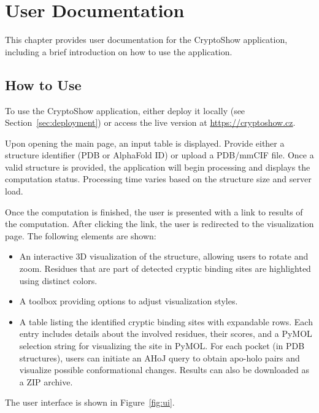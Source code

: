 \chapter{User Documentation}
\label{chap:user-documentation}

This chapter provides user documentation for the CryptoShow application, including a brief introduction on how to use the application.

\section{How to Use}
\label{sec:how-to-use}

To use the CryptoShow application, either deploy it locally (see Section~\ref{sec:deployment}) or access the live version at \url{https://cryptoshow.cz}.

Upon opening the main page, an input table is displayed. Provide either a structure identifier (PDB or AlphaFold ID) or upload a PDB/mmCIF file. Once a valid structure is provided, the application will begin processing and displays the computation status. Processing time varies based on the structure size and server load.

Once the computation is finished, the user is presented with a link to results of the computation. After clicking the link, the user is redirected to the visualization page. The following elements are shown:

\begin{itemize}
    \item An interactive 3D visualization of the structure, allowing users to rotate and zoom. Residues that are part of detected cryptic binding sites are highlighted using distinct colors.
    \item A toolbox providing options to adjust visualization styles.
    \item A table listing the identified cryptic binding sites with expandable rows. Each entry includes details about the involved residues, their scores, and a PyMOL selection string for visualizing the site in PyMOL. For each pocket (in PDB structures), users can initiate an AHoJ query to obtain apo-holo pairs and visualize possible conformational changes. Results can also be downloaded as a ZIP archive.
\end{itemize}

The user interface is shown in Figure~\ref{fig:ui}.


